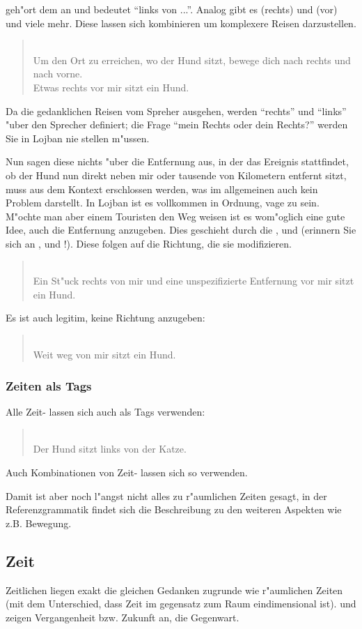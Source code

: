  geh"ort dem  an und bedeutet ``links von ...''. Analog gibt es  (rechts) und  (vor) und viele mehr.
Diese  lassen sich kombinieren um komplexere Reisen darzustellen.
\begin{quote}
 \\
Um den Ort zu erreichen, wo der Hund sitzt, bewege dich nach rechts und nach vorne. \\
Etwas rechts vor mir sitzt ein Hund.
\end{quote}
Da die gedanklichen Reisen vom Spreher ausgehen, werden ``rechts'' und ``links'' "uber den Sprecher definiert; die Frage ``mein Rechts oder dein Rechts?'' werden Sie in Lojban nie stellen m"ussen.

Nun sagen diese  nichts "uber die Entfernung aus, in der das Ereignis stattfindet, ob der Hund nun direkt neben mir oder tausende von
Kilometern entfernt sitzt, muss aus dem Kontext erschlossen werden, was im allgemeinen auch kein Problem darstellt. In Lojban ist es vollkommen
in Ordnung, vage zu sein. M"ochte man aber einem Touristen den Weg weisen ist es wom"oglich eine gute Idee, auch die Entfernung anzugeben.
Dies geschieht durch die  ,  und  (erinnern Sie sich an ,  und !). Diese  folgen auf die Richtung, die sie modifizieren.

\begin{quote}
 \\
Ein St"uck rechts von mir und eine unspezifizierte Entfernung vor mir sitzt ein Hund.
\end{quote}

Es ist auch legitim, keine Richtung anzugeben:
\begin{quote}
 \\
Weit weg von mir sitzt ein Hund.
\end{quote}

\subsubsection{Zeiten als Tags}
Alle Zeit- lassen sich auch als Tags verwenden:
\begin{quote}
 \\
Der Hund sitzt links von der Katze.
\end{quote}
Auch Kombinationen von Zeit- lassen sich so verwenden.

Damit ist aber noch l"angst nicht alles zu r"aumlichen Zeiten gesagt, in der Referenzgrammatik findet sich die Beschreibung zu den weiteren
Aspekten wie z.B. Bewegung.

\subsection{Zeit}
Zeitlichen  liegen exakt die gleichen Gedanken zugrunde wie r"aumlichen Zeiten (mit dem Unterschied, dass Zeit im gegensatz zum
Raum eindimensional ist).  und  zeigen Vergangenheit bzw. Zukunft an,  die Gegenwart.
